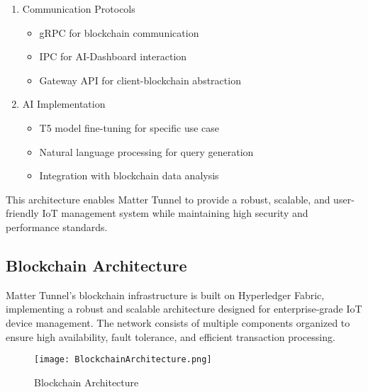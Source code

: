 \documentclass[conference]{IEEEtran}
\begin{document}
\begin{enumerate}[itemsep=2ex, parsep=1ex]
\begin{enumerate}
		\item Communication Protocols
		      \begin{itemize}[itemsep=0.5pt, parsep=0.5pt]
		      	\item gRPC for blockchain communication
		      	\item IPC for AI-Dashboard interaction
		      	\item Gateway API for client-blockchain abstraction
		      \end{itemize}
		      		      		      
		\item AI Implementation
		      \begin{itemize}[itemsep=0.5pt, parsep=0.5pt]
		      	\item T5 model fine-tuning for specific use case
		      	\item Natural language processing for query generation
		      	\item Integration with blockchain data analysis
		      \end{itemize}
	\end{enumerate}
\end{enumerate}

This architecture enables Matter Tunnel to provide a robust, scalable, and user-friendly IoT management system while maintaining high security and performance standards.
    
\subsection{Blockchain Architecture}

Matter Tunnel's blockchain infrastructure is built on Hyperledger Fabric, implementing a robust and scalable architecture designed for enterprise-grade IoT device management. The network consists of multiple components organized to ensure high availability, fault tolerance, and efficient transaction processing.

\begin{figure}[h!]
	\centering
	\texttt{[image: BlockchainArchitecture.png]}
	\caption{Blockchain Architecture}
	\label{fig:Blockchain Architecture}
\end{figure}
\end{document}
